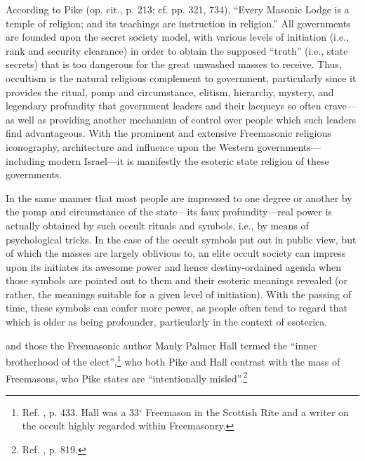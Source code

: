 \documentclass[letterpaper,12pt]{article}
\begin{document}
{    According to Pike (op. cit., p. 213; cf. pp. 321, 734), ``Every Masonic Lodge is a temple of religion; and its teachings are instruction in religion.'' All governments are founded upon the secret society model, with various levels of initiation (i.e., rank and security clearance) in order to obtain the supposed ``truth'' (i.e., state secrets) that is too dangerous for the great unwashed masses to receive. Thus, occultism is the natural religious complement to government, particularly since it provides the ritual, pomp and circumstance, elitism, hierarchy, mystery, and legendary profundity that government leaders and their lacqueys so often crave---as well as providing another mechanism of control over people which such leaders find advantageous. With the prominent and extensive Freemasonic religious iconography, architecture and influence upon the Western governments---including modern Israel---it is manifestly the esoteric state religion of these governments.\par
    In the same manner that most people are impressed to one degree or another by the pomp and circumstance of the state---its faux profundity---real power is actually obtained by such occult rituals and symbols, i.e., by means of psychological tricks. In the case of the occult symbols put out in public view, but of which the masses are largely oblivious to, an elite occult society can impress upon its initiates its awesome power and hence destiny-ordained agenda when those symbols are pointed out to them and their esoteric meanings revealed (or rather, the meanings suitable for a given level of initiation). With the passing of time, these symbols can confer more power, as people often tend to regard that which is older as being profounder, particularly in the context of esoterica.} and those the Freemasonic author Manly Palmer Hall termed the ``inner brotherhood of the elect'',\footnote{Ref. , p. 433. Hall was a 33\( ^{\circ} \) Freemason in the Scottish Rite and a writer on the occult highly regarded within Freemasonry.} who both Pike and Hall contrast with the mass of Freemasons, who Pike states are ``intentionally misled''.\footnote{Ref. , p. 819.}
\end{document}
